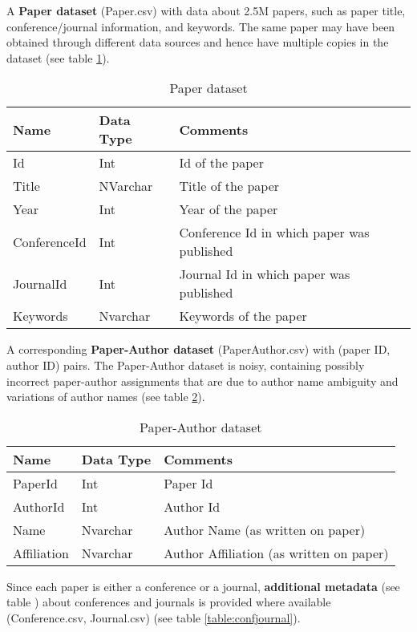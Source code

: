 \documentclass[a4paper]{article}
\begin{document}
A \textbf{Paper dataset} (Paper.csv) with data about 2.5M papers, such as paper title, conference/journal information, and keywords. The same paper may have been obtained through different data sources and hence have multiple copies in the dataset (see table \ref{table:paper}). 

\begin{table}
  \caption{Paper dataset}
\begin{tabular}{ |l |l |l |}
  \hline
 \textbf{Name} & \textbf{Data Type} & \textbf{Comments} \\ \hline
  Id & Int & Id of the paper \\ \hline
  Title & NVarchar &  Title of the paper\\ \hline
  Year & Int & Year of the paper  \\ \hline
  ConferenceId & Int & Conference Id in which paper was published\\ \hline
  JournalId & Int & Journal Id in which paper was published \\ \hline
  Keywords & Nvarchar & Keywords of the paper \\ \hline  
\end{tabular}
\label{table:paper}
\end{table}

A corresponding \textbf{Paper-Author dataset} (PaperAuthor.csv) with (paper ID, author ID) pairs. The Paper-Author dataset is noisy, containing possibly incorrect paper-author assignments that are due to author name ambiguity and variations of author names (see table \ref{table:paperauthor}).

\begin{table}
  \caption{Paper-Author dataset}
\begin{tabular}{ |l |l |l |}
  \hline
 \textbf{Name} & \textbf{Data Type} & \textbf{Comments} \\ \hline
  PaperId & Int & Paper Id\\ \hline
  AuthorId & Int & Author Id\\ \hline
  Name & Nvarchar & Author Name (as written on paper)\\ \hline
  Affiliation & Nvarchar & Author Affiliation (as written on paper)\\ \hline
\end{tabular}
\label{table:paperauthor}
\end{table}

Since each paper is either a conference or a journal, \textbf{additional metadata} (see table ) about conferences and journals is provided where available (Conference.csv, Journal.csv) (see table \ref{table:confjournal}).
\end{document}
